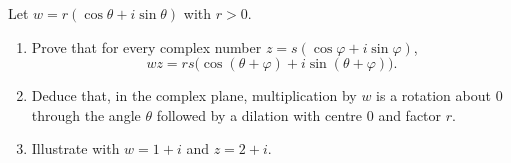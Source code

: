 Let $w=r(\cos\theta+i\sin\theta)$ with $r>0$.
\begin{enumerate}
\item[(a)] Prove that for every complex number $z=s(\cos\varphi+i\sin\varphi)$,
\[wz=rs\bigl(\cos(\theta+\varphi)+i\sin(\theta+\varphi)\bigr).\]
\item[(b)] Deduce that, in the complex plane, multiplication by $w$ is a rotation about $0$ through the angle $\theta$ followed by a dilation with centre $0$ and factor $r$.
\item[(c)] Illustrate with $w=1+i$ and $z=2+i$.
\end{enumerate}
